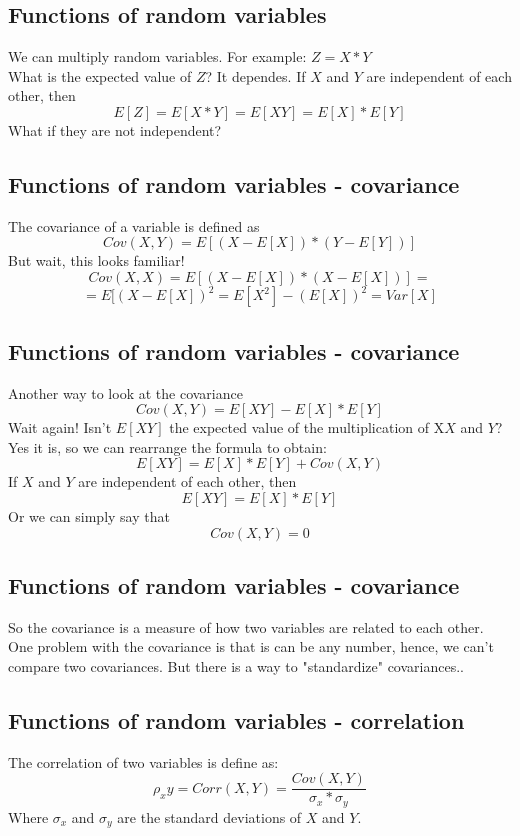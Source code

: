 \documentclass[11pt]{article}
\begin{document}
	\subsection*{Functions of random variables}
	We can multiply random variables. For example: $Z=X*Y$
	\newline\\
	What is the expected value of $Z$? It dependes. If $X$ and $Y$ are independent of each other, then	
	\[E[Z] = E[X*Y] =E[XY] = E[X] * E[Y]\]
	What if they are not independent?

	\subsection*{Functions of random variables - covariance}
	The covariance of a variable is defined as
	\[Cov(X,Y) = E[(X-E[X]) * (Y-E[Y])]\]
	But wait, this looks familiar!
	\[Cov(X,X) = E[(X-E[X]) * (X-E[X])] = \]
	\[= E[(X-E[X])^2 = E[X^2] - (E[X])^2 = Var[X]\]


	\subsection*{Functions of random variables - covariance}
	Another way to look at the covariance 
	\[Cov(X,Y) = E[XY] - E[X]*E[Y]\]
	Wait again! Isn't $E[XY]$ the expected value of the multiplication of X$X$ and $Y$? Yes it is, so we can rearrange the formula to obtain:
	\[E[XY] = E[X]*E[Y] + Cov(X,Y)\]
	If $X$ and $Y$ are independent of each other, then 
	\[E[XY] = E[X]*E[Y]\]
	Or we can simply say that
	\[Cov(X,Y) = 0\]

	\subsection*{Functions of random variables - covariance}
	So the covariance is a measure of how two variables are related to each other. One problem with the covariance is that is can be any number, hence, we can't compare two covariances. But there is a way to "standardize" covariances..

	\subsection*{Functions of random variables - correlation}
	The correlation of two variables is define as:
	\[\rho_xy = Corr(X,Y) = \frac{Cov(X,Y)}{\sigma_x*\sigma_y} \]
	Where $\sigma_x$ and $\sigma_y$ are the standard deviations of $X$ and $Y$.
\end{document}
